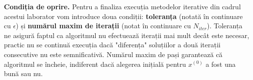 \documentclass{exam}
\begin{document}







\textbf{Condiția de oprire.}  Pentru a finaliza execuția metodelor iterative din
cadrul acestui laborator vom introduce doua condiții: \textbf{toleranța} (notată
în continuare cu \(\epsilon\)) și \textbf{numărul maxim de iterații} (notat în
continuare cu \(N_{iter}\)). Toleranța ne asigură faptul ca algoritmul nu
efectuează iterații mai mult decât este necesar, practic nu se continuă execuția
dacă "diferența" soluțiilor a două iterații consecutive nu este semnificativă.
Numărul maxim de pași garantează că algoritmul se încheie, indiferent dacă
alegerea inițială pentru \(x^{(0)}\) a fost una bună sau nu.
\end{document}
